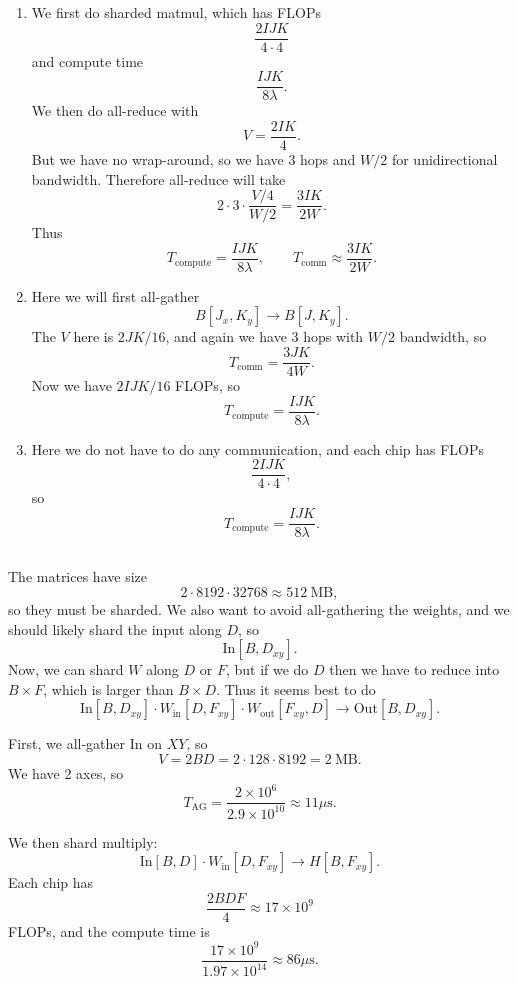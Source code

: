 \documentclass[11pt]{article}
\newcommand{\B}{B}
\newcommand{\D}{D}
\newcommand{\F}{F}
\newcommand{\W}{W}
\newcommand{\lam}{\lambda}
\newcommand{\us}{\mu\mathrm{s}}
\newcommand{\exercisebreak}{\Needspace{8\baselineskip}}
\begin{document}
\begin{enumerate}[label=(\alph*)]
  \item We first do sharded matmul, which has FLOPs
  \[
    \frac{2IJK}{4\cdot 4}
  \]
  and compute time
  \[
    \frac{IJK}{8\lam}.
  \]
  We then do all-reduce with
  \[
    V=\frac{2IK}{4}.
  \]
  But we have no wrap-around, so we have 3 hops and $\W/2$ for unidirectional bandwidth. Therefore all-reduce will take
  \[
    2\cdot 3\cdot \frac{V/4}{\W/2}
    =
    \frac{3IK}{2\W}.
  \]
  Thus
  \[
    T_{\mathrm{compute}}=\frac{IJK}{8\lam},
    \qquad
    T_{\mathrm{comm}}\approx \frac{3IK}{2\W}.
  \]

  \item Here we will first all-gather
  \[
    B[J_x,K_y]\to B[J,K_y].
  \]
  The $V$ here is $2JK/16$, and again we have 3 hops with $\W/2$ bandwidth, so
  \[
    T_{\mathrm{comm}}=\frac{3JK}{4\W}.
  \]
  Now we have $2IJK/16$ FLOPs, so
  \[
    T_{\mathrm{compute}}=\frac{IJK}{8\lam}.
  \]

  \item Here we do not have to do any communication, and each chip has FLOPs
  \[
    \frac{2IJK}{4\cdot 4},
  \]
  so
  \[
    T_{\mathrm{compute}}=\frac{IJK}{8\lam}.
  \]
\end{enumerate}

\exercisebreak
\subsection{}
The matrices have size
\[
  2\cdot 8192\cdot 32768\approx 512\ \mathrm{MB},
\]
so they must be sharded. We also want to avoid all-gathering the weights, and we should likely shard the input along $\D$, so
\[
  \mathrm{In}[B,D_{xy}].
\]
Now, we can shard $\W$ along $\D$ or $\F$, but if we do $\D$ then we have to reduce into $B\times F$, which is larger than $B\times D$. Thus it seems best to do
\[
  \mathrm{In}[B,D_{xy}]
  \cdot
  W_{\mathrm{in}}[D,F_{xy}]
  \cdot
  W_{\mathrm{out}}[F_{xy},D]
  \to
  \mathrm{Out}[B,D_{xy}].
\]

First, we all-gather $\mathrm{In}$ on $XY$, so
\[
  V=2\B\D=2\cdot 128\cdot 8192=2\ \mathrm{MB}.
\]
We have 2 axes, so
\[
  T_{\mathrm{AG}}=\frac{2\times 10^6}{2.9\times 10^{10}}\approx 11\us.
\]

We then shard multiply:
\[
  \mathrm{In}[B,D]\cdot W_{\mathrm{in}}[D,F_{xy}]
  \to H[B,F_{xy}].
\]
Each chip has
\[
  \frac{2\B\D\F}{4}\approx 17\times 10^9
\]
FLOPs, and the compute time is
\[
  \frac{17\times 10^9}{1.97\times 10^{14}}\approx 86\us.
\]
\end{document}
